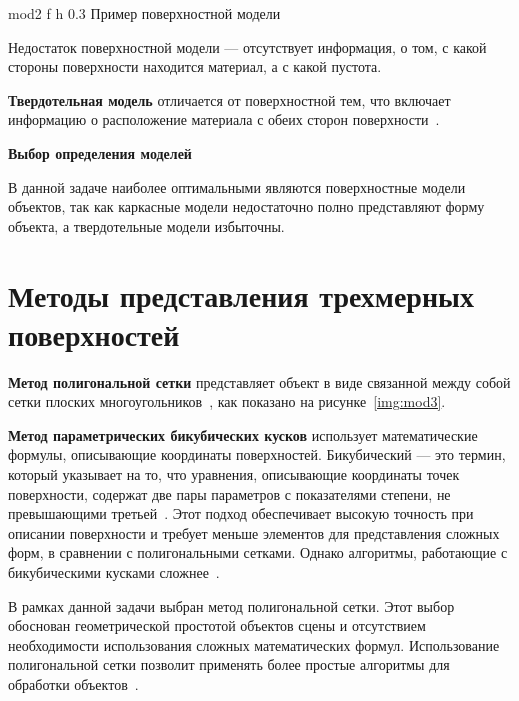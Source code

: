 	{mod2} %
	{f} %
	{h} %
	{0.3\textwidth} %
	{Пример поверхностной модели} %


Недостаток поверхностной модели --- отсутствует информация, о том, с какой стороны поверхности находится материал, а с какой пустота.

\textbf{Твердотельная модель} отличается от поверхностной тем, что включает информацию о расположение материала с обеих сторон поверхности~\cite{model_geom_01}.

\textbf{Выбор определения моделей} 

В данной задаче наиболее оптимальными являются поверхностные модели объектов, так как каркасные модели недостаточно полно представляют форму объекта, а твердотельные модели избыточны.


\section{Методы представления трехмерных поверхностей}

\textbf{Метод полигональной сетки} представляет объект в виде связанной между собой сетки плоских многоугольников~\cite{model_geom}, как показано на рисунке~\ref{img:mod3}.

\textbf{Метод параметрических бикубических кусков} использует математические формулы, описывающие координаты поверхностей.
Бикубический --- это термин, который указывает на то, что уравнения, описывающие координаты точек поверхности, содержат две пары параметров с показателями степени, не превышающими третьей~\cite{model_geom}.
Этот подход обеспечивает высокую точность при описании поверхности и требует меньше элементов для представления сложных форм, в сравнении с полигональными сетками.
Однако алгоритмы, работающие с бикубическими кусками сложнее~\cite{model_geom}.

В рамках данной задачи выбран метод полигональной сетки.
Этот выбор обоснован геометрической простотой объектов сцены и отсутствием необходимости использования сложных математических формул.
Использование полигональной сетки позволит применять более простые алгоритмы для обработки объектов~\cite{model_geom}.

